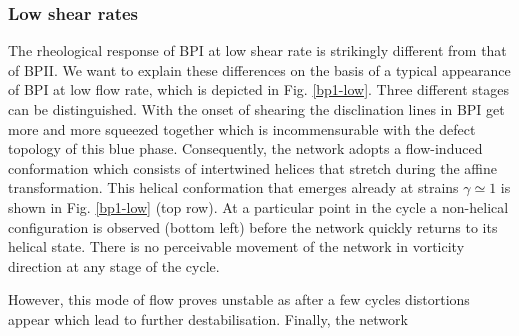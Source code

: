 \documentclass[aps,pre,reprint,superscriptaddress, twocolumn]{revtex4}
\begin{document}
\subsubsection{Low shear rates}

The rheological response of BPI at low shear rate is strikingly 
different from that of BPII.
We want to explain these differences on the basis of a typical 
appearance of BPI at low flow rate, which is depicted in Fig. \ref{bp1-low}.
Three different stages can be distinguished. 
With the onset of shearing the disclination lines 
in BPI get more and more squeezed together which is incommensurable with 
the defect topology of this blue phase. 
Consequently, the network adopts a flow-induced conformation which consists 
of intertwined helices that stretch during the affine transformation.
This helical conformation that emerges already at strains $\gamma\simeq1$ 
is shown in Fig. \ref{bp1-low} (top row).
At a particular point in the cycle a non-helical configuration is
observed (bottom left) before the network quickly returns
to its helical state.
There is no perceivable movement of the network in vorticity 
direction at any stage of the cycle.

However, this mode of flow proves unstable as after a few cycles 
distortions appear which lead to further destabilisation.
Finally, the network
\end{document}
